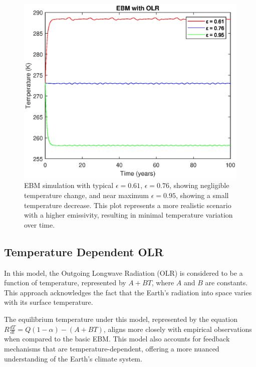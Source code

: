 \documentclass[12pt]{article}
\begin{document}
\begin{figure}[!hbt]
    \centering
    \includegraphics[width=\textwidth]{ebm_with_diff_olrs.eps}
    \caption{EBM simulation with typical $\epsilon=0.61$,
    $\epsilon=0.76$, 
    showing negligible temperature change,
    and near maximum $\epsilon=0.95$, 
    showing a small temperature decrease. 
    This plot represents a more realistic scenario 
    with a higher emissivity, 
    resulting in minimal temperature variation over time.}

    \label{fig:sub2}
\end{figure}


\subsection{Temperature Dependent OLR}
In this model, the Outgoing Longwave Radiation (OLR) 
is considered to be a function of temperature, 
represented by \( A + BT \), 
where \( A \) and \( B \) are constants. 
This approach acknowledges the fact that the Earth's radiation 
into space varies with its surface temperature. 

The equilibrium temperature under this model, 
represented by the equation 
\( R\frac{dT}{dt} = Q(1 - \alpha) - (A + BT) \), 
aligns more closely with empirical observations 
when compared to the basic EBM. 
This model also accounts for feedback mechanisms 
that are temperature-dependent, 
offering a more nuanced understanding of the Earth's climate system. 
\end{document}
